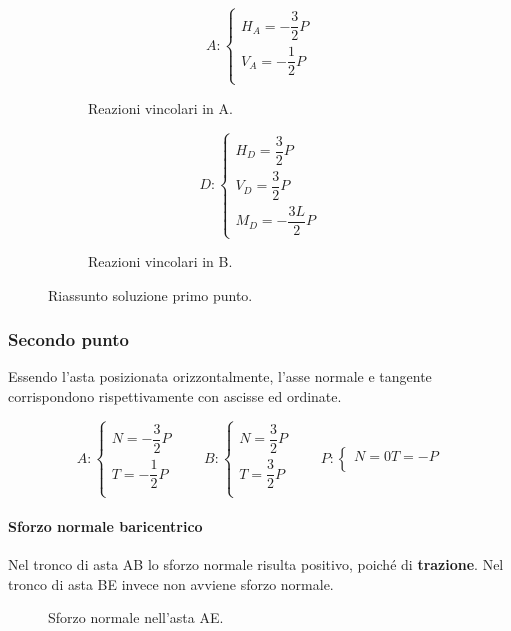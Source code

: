 \documentclass[main.tex]{subfiles}
\begin{document}
\begin{figure}[H]
  \begin{subfigure}[b]{.5\textwidth}
  \centering
  \[
  	A: \begin{cases}
		H_A = - \dfrac{3}{2}P\\
		V_A = - \dfrac{1}{2}P\\
  	\end{cases}
  \]
  \caption{Reazioni vincolari in A.}
  \end{subfigure}
  \hfill
  \begin{subfigure}[b]{.5\textwidth}
  \centering
  \[
  	D: \begin{cases}
  		H_D =  \dfrac{3}{2}P\\
  		V_D =  \dfrac{3}{2}P\\
  		M_D =  -\dfrac{3L}{2}P
  	\end{cases}
  \]
  \caption{Reazioni vincolari in B.}
  \end{subfigure}
  \caption{Riassunto soluzione primo punto.}
\end{figure}

\subsubsection{Secondo punto}
Essendo l'asta posizionata orizzontalmente, l'asse normale e  tangente corrispondono rispettivamente con ascisse ed ordinate.

\[
	A: \begin{cases}
		N = - \dfrac{3}{2}P\\
		T = - \dfrac{1}{2}P\\
	\end{cases}
	\qquad
	B: \begin{cases}
		N =  \dfrac{3}{2}P\\
  		T =  \dfrac{3}{2}P\\
	\end{cases}
	\qquad
	P: \begin{cases}
		N =  0
  		T =  -P\\
	\end{cases}
\]

\paragraph{Sforzo normale baricentrico} Nel tronco di asta AB lo sforzo normale risulta positivo, poiché di \textbf{trazione}. Nel tronco di asta BE invece non avviene sforzo normale.

\begin{figure}[H]
\centering
\resizebox{.5\textwidth}{!}{}
\caption{Sforzo normale nell'asta AE.}
\end{figure}
\end{document}
